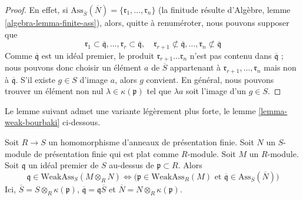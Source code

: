 \begin{proof}
En effet, si $\text{Ass}_{\overline{S}}(\overline{N}) =
\{\mathfrak r_1, \ldots, \mathfrak r_n\}$
(la finitude résulte d'Algèbre, lemme \ref{algebra-lemma-finite-ass}),
alors, quitte à renuméroter, nous pouvons supposer que
$$
\mathfrak r_1 \subset \overline{\mathfrak q},
\ldots,
\mathfrak r_r \subset \overline{\mathfrak q}, \quad
\mathfrak r_{r + 1} \not \subset \overline{\mathfrak q},
\ldots,
\mathfrak r_n \not \subset \overline{\mathfrak q}
$$
Comme $\overline{\mathfrak q}$ est un idéal premier, le produit
$\mathfrak r_{r + 1} \ldots \mathfrak r_n$ n'est pas contenu dans
$\overline{\mathfrak q}$ ; nous pouvons donc choisir un élément
$a$ de $\overline{S}$ appartenant à
$\mathfrak r_{r + 1}, \ldots, \mathfrak r_n$ mais non à
$\overline{\mathfrak q}$.
S'il existe $g \in S$ d'image $a$, alors $g$
convient. En général, nous pouvons trouver un élément non nul
$\lambda \in \kappa(\mathfrak p)$
tel que $\lambda a$ soit l'image d'un $g \in S$.
\end{proof}

\noindent
Le lemme suivant admet une variante légèrement plus forte,
le lemme \ref{lemma-weak-bourbaki}
ci-dessous.

\begin{lemma}
\label{lemma-weak-bourbaki-pre}
Soit $R \to S$ un homomorphisme d'anneaux de présentation finie.
Soit $N$ un $S$-module de présentation finie
qui est plat comme $R$-module. Soit $M$ un $R$-module.
Soit $\mathfrak q$ un idéal premier de $S$ au-dessus de $\mathfrak p \subset R$.
Alors
$$
\mathfrak q \in \text{WeakAss}_S(M \otimes_R N)
\Leftrightarrow
\Big(
\mathfrak p \in \text{WeakAss}_R(M)
\text{ et }
\overline{\mathfrak q} \in \text{Ass}_{\overline{S}}(\overline{N})
\Big)
$$
Ici, $\overline{S} = S \otimes_R \kappa(\mathfrak p)$,
$\overline{\mathfrak q} = \mathfrak q \overline{S}$ et
$\overline{N} = N \otimes_R \kappa(\mathfrak p)$.
\end{lemma}

